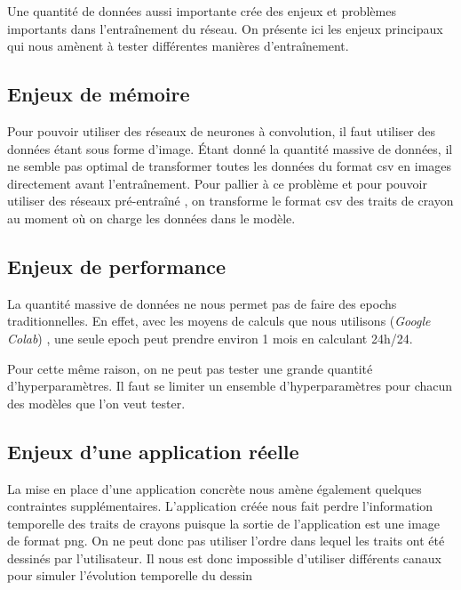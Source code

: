 Une quantité de données aussi importante crée des enjeux et problèmes importants dans l'entraînement du réseau. On présente ici les enjeux principaux qui nous amènent à tester différentes manières d'entraînement.


\subsection{Enjeux de mémoire}

Pour pouvoir utiliser des réseaux de neurones à convolution, il faut utiliser des données étant sous forme d'image. Étant donné la quantité massive de données, il ne semble pas optimal de transformer toutes les données du format csv en images directement avant l'entraînement. Pour pallier à ce problème et pour pouvoir utiliser des réseaux pré-entraîné , on transforme le format csv des traits de crayon au moment où on charge les données dans le modèle.

\subsection{Enjeux de performance}

La quantité massive de données ne nous permet pas de faire des epochs traditionnelles. En effet, avec les moyens de calculs que nous utilisons (\emph{Google Colab}) , une seule epoch peut prendre environ 1 mois en calculant 24h/24.

Pour cette même raison, on ne peut pas tester une grande quantité d'hyperparamètres. Il faut se limiter un ensemble d'hyperparamètres pour chacun des modèles que l'on veut tester.


\subsection{Enjeux d'une application réelle}

La mise en place d'une application concrète nous amène également quelques contraintes supplémentaires. L'application créée nous fait perdre l'information temporelle des traits de crayons puisque la sortie de l'application est une image de format png. On ne peut donc pas utiliser l'ordre dans lequel les traits ont été dessinés par l'utilisateur. Il nous est donc impossible d'utiliser différents canaux pour simuler l'évolution temporelle du dessin





